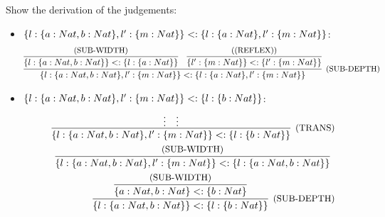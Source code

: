 \subsection{}

Show the derivation of the judgements:
\begin{itemize}
	\item $\{l: \{a: Nat, b: Nat\}, l': \{m: Nat\}\} <: \{l: \{a: Nat\}, l': \{m:Nat\}\}$:
	      \begin{align*}
		      \infer[\text{\small{(SUB-DEPTH)}}]
		      {\REC{l: \TREC{a: Nat, b: Nat}, l': \TREC{m: Nat}} <: \TREC{l: \TREC{a: Nat}, l': \TREC{m:Nat}}}
		      {
			      \infer{\REC{l: \TREC{a: Nat, b: Nat}} <: \TREC{l: \TREC{a: Nat}}}
		      {\text{\small{(SUB-WIDTH)}}} &
			      \infer{\REC{l': \TREC{m: Nat}} <: \TREC{l': \TREC{m:Nat}}}
			      {\text{\small{((REFLEX))}}}
		      }
	      \end{align*}
	\item $\{l: \{a: Nat, b: Nat\}, l': \{m: Nat\}\} <: \{l: \{b: Nat\}\}$:
	      \begin{align*}
		      \infer[\text{\small{(TRANS)}}]
		      {\REC{l: \TREC{a: Nat, b: Nat}, l': \TREC{m: Nat}} <: \TREC{l: \TREC{b: Nat}}}
		      { \vdots & \vdots }          \\
		      \infer[]
		      {\REC{l: \TREC{a: Nat, b: Nat}, l': \TREC{m: Nat}} <: \TREC{l: \TREC{a: Nat, b: Nat}}}
		      {\text{\small{(SUB-WIDTH)}}} \\
		      \infer[\text{\small{(SUB-DEPTH)}}]
		      {\REC{l: \TREC{a: Nat, b: Nat}} <: \TREC{l: \TREC{b: Nat}}}
		      {
			      \infer[]
			      {\TREC{a: Nat, b: Nat} <: \TREC{b: Nat}}
			      {\text{\small{(SUB-WIDTH)}}}
		      }
	      \end{align*}
\end{itemize}
